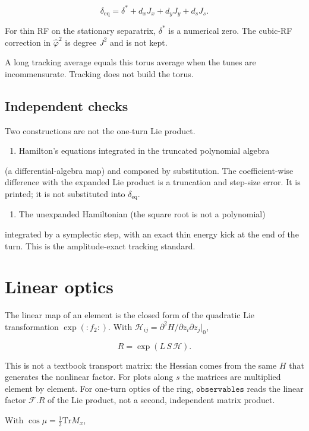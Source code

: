 \documentclass[11pt,a4paper]{article}
\begin{document}
\[
\delta_{\mathrm{eq}}=\delta^\ast+d_x J_x+d_y J_y+d_s J_s.
\]

For thin RF on the stationary separatrix, $\delta^\ast$ is a numerical
zero. The cubic-RF correction in $\hat\varphi^2$ is degree $J^2$ and is
not kept.

A long tracking average equals this torus average when the tunes are
incommensurate. Tracking does not build the torus.

\subsection{Independent checks}

Two constructions are not the one-turn Lie product.

\begin{enumerate}
\item Hamilton's equations integrated in the truncated polynomial algebra
\end{enumerate}
   (a differential-algebra map) and composed by substitution. The
   coefficient-wise difference with the expanded Lie product is a
   truncation and step-size error. It is printed; it is not substituted
   into $\delta_{\mathrm{eq}}$.
\begin{enumerate}
\item The unexpanded Hamiltonian (the square root is not a polynomial)
\end{enumerate}
   integrated by a symplectic step, with an exact thin energy kick at the
   end of the turn. This is the amplitude-exact tracking standard.

\clearpage
\section{Linear optics}

The linear map of an element is the closed form of the quadratic Lie
transformation $\exp(:f_2:)$. With
$\mathcal{H}_{ij}=\partial^2 H/\partial z_i\partial z_j|_0$,

\[
R=\exp(L\,S\,\mathcal{H}).
\]

This is not a textbook transport matrix: the Hessian comes from the same
$H$ that generates the nonlinear factor. For plots along $s$ the
matrices are multiplied element by element. For one-turn optics of the
ring, $\mathtt{observables}$ reads the linear factor $\mathcal{F}.R$
of the Lie product, not a second, independent matrix product.

With $\cos\mu=\tfrac12\mathrm{Tr}M_x$,
\end{document}
